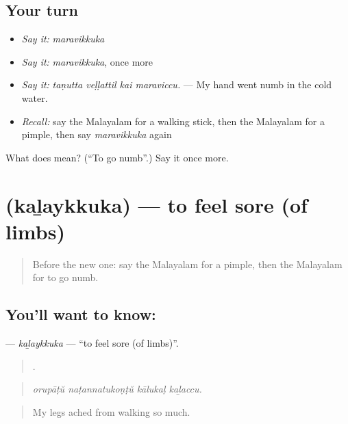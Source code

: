 \subsection*{Your turn}
\begin{itemize}
\raggedright
  \item \emph{Say it:} \emph{maravikkuka}
  \item \emph{Say it:} \emph{maravikkuka}, once more
  \item \emph{Say it:} \emph{taṇutta veḷḷattil kai maraviccu.} — My hand went numb in the cold water.
  \item \emph{Recall:} say the Malayalam for a walking stick, then the Malayalam for a pimple, then say \emph{maravikkuka} again
\end{itemize}

\begin{tcolorbox}[breakable,colback=teal!4,colframe=teal!35!black,title={Before you move on}]
What does  mean? (\textquotedblleft{}To go numb\textquotedblright{}.) Say it once more.
\end{tcolorbox}
\section[\texorpdfstring{\ml{കഴയ്ക്കുക} (kaḻaykkuka)}{കഴയ്ക്കുക (kaḻaykkuka)}]{ (kaḻaykkuka) — to feel sore (of limbs)}

\label{lesson:ML-C540-kalaykkuka}



\begin{quote}
Before the new one: say the Malayalam for a pimple, then the Malayalam for to go numb.
\end{quote}

\subsection*{You'll want to know: }
\textbf{} — \emph{kaḻaykkuka} — \textquotedblleft{}to feel sore (of limbs)\textquotedblright{}.

\begin{quote}
   .
\end{quote}

\begin{quote}
\emph{orupāṭŭ naṭannatukoṇṭŭ kālukaḷ kaḻaccu.}
\end{quote}

\begin{quote}
My legs ached from walking so much.
\end{quote}

